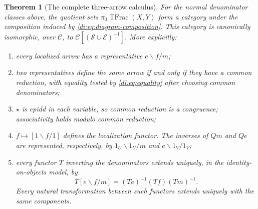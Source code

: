 \documentclass[11pt,reqno,a4paper]{amsart}
\newtheorem{theorem}{Theorem}[section]
\theoremstyle{definition}
\theoremstyle{remark}
\newcommand{\C}{\mathcal{C}}
\newcommand{\0}{\mathbf{0}}
\renewcommand{\1}{\mathbf{1}}
\newcommand{\Sden}{\mathcal S}
\newcommand{\Eden}{\mathcal E}
\DeclareMathOperator{\TFrac}{TFrac}
\begin{document}
\begin{theorem}[The complete three-arrow calculus]\label{di:thm:composition}
For the normal denominator classes above, the quotient sets
$\pi_0\TFrac(X,Y)$ form a category under the composition induced by
\eqref{di:eq:diagram-composition}. This category is canonically
isomorphic, over $\C$, to
$\C[(\Sden\cup\Eden)^{-1}]$. More explicitly:
\begin{enumerate}[label=\textup{(\roman*)}]
\item every localized arrow has a representative $e\backslash f/m$;
\item two representatives define the same arrow if and only if they
have a common reduction, with equality tested by
\eqref{di:eq:equality} after choosing common denominators;
\item $\star$ is epidd in each variable, so common reduction is a
congruence; associativity holds modulo common reduction;
\item $f\mapsto[1\backslash f/1]$ defines the localization functor.
The inverses of $Qm$ and $Qe$ are represented, respectively, by
$1_U\backslash1_U/m$ and $e\backslash1_V/1_V$;
\item every functor $T$ inverting the denominators extends uniquely,
in the identity-on-objects model, by
\[
 \overline T[e\backslash f/m]=(Te)^{-1}(Tf)(Tm)^{-1}.
\]
Every natural transformation between such functors extends uniquely
with the same components.
\end{enumerate}
\end{theorem}
\end{document}
